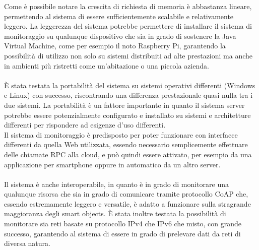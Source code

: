 \vspace{1.0cm}
Come è possibile notare la crescita di richiesta di memoria è abbastanza lineare, permettendo al sistema di essere sufficientemente scalabile e relativamente leggero. La leggerezza del sistema potrebbe permettere di installare il sistema di monitoraggio su qualunque dispositivo che sia in grado di sostenere la Java Virtual Machine, come per esempio il noto Raspberry Pi, garantendo la possibilità di utilizzo non solo su sistemi distribuiti ad alte prestazioni ma anche in ambienti più ristretti come un'abitazione o una piccola azienda.
\\\\È stata testata la portabilità del sistema su sistemi operativi differenti (Windows e Linux) con successo, riscontrando una differenza prestazionale quasi nulla tra i due sistemi. La portabilità è un fattore importante in quanto il sistema server potrebbe essere potenzialmente configurato e installato su sistemi e architetture differenti per rispondere ad esigenze d'uso differenti.
\\Il sistema di monitoraggio è predisposto per poter funzionare con interfacce differenti da quella Web utilizzata, essendo necessario semplicemente effettuare delle chiamate RPC alla cloud, e può quindi essere attivato, per esempio da una applicazione per smartphone oppure in automatico da un altro server.
\\\\Il sistema è anche interoperabile, in quanto è in grado di monitorare una qualunque risorsa che sia in grado di comunicare tramite protocollo CoAP che, essendo estremamente leggero e versatile, è adatto a funzionare sulla stragrande maggioranza degli smart objects. È stata inoltre testata la possibilità di monitorare sia reti basate su protocollo IPv4 che IPv6 che misto, con grande successo, garantendo al sistema di essere in grado di prelevare dati da reti di diversa natura.

